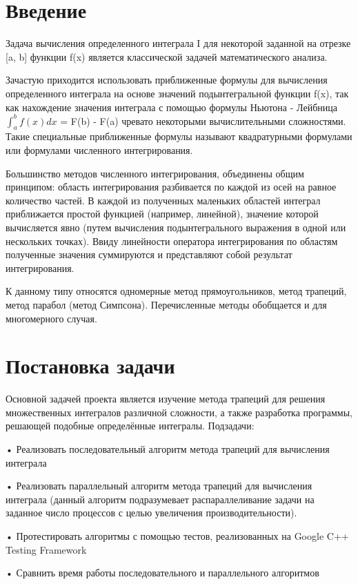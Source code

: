 \documentclass{report}
\begin{document}
	\setcounter{page}{2}
	
	\tableofcontents
	\newpage
	
	\section*{Введение}
	Задача вычисления определенного интеграла I для некоторой заданной на отрезке [a, b] функции f(x) является классической задачей математического анализа.
	\par Зачастую приходится использовать приближенные формулы для вычисления определенного интеграла на основе значений подынтегральной функции f(x), так как нахождение значения интеграла с помощью формулы Ньютона - Лейбница $\int_a^b f(x)dx$ = F(b) - F(a) чревато некоторыми вычислительными сложностями. Такие специальные приближенные формулы называют квадратурными формулами или формулами численного интегрирования.
	\par Большинство методов численного интегрирования, объединены общим принципом: область интегрирования разбивается по каждой из осей на равное количество частей. В каждой из полученных маленьких областей интеграл приближается простой функцией (например, линейной), значение которой вычисляется явно (путем вычисления подынтегрального выражения в одной или нескольких точках). Ввиду линейности оператора интегрирования по областям полученные значения суммируются и представляют собой результат интегрирования.
	\par К данному типу относятся одномерные метод прямоугольников, метод трапеций, метод парабол (метод Симпсона). Перечисленные методы обобщается и для многомерного случая.
	
	\newpage
	
	\section*{Постановка задачи}
	Основной задачей проекта является изучение метода трапеций для решения множественных интегралов различной сложности, а также разработка программы, решающей подобные определённые интегралы. 
	Подзадачи: 
	\par•	Реализовать последовательный алгоритм метода трапеций для вычисления интеграла 
	\par•	Реализовать параллельный алгоритм метода трапеций для вычисления интеграла (данный алгоритм подразумевает распараллеливание задачи на заданное число процессов с целью увеличения производительности). 
	\par•	Протестировать алгоритмы с помощью тестов, реализованных на  Google C++ Testing Framework 
	\par•	Сравнить время работы последовательного и параллельного алгоритмов
	
\end{document}
